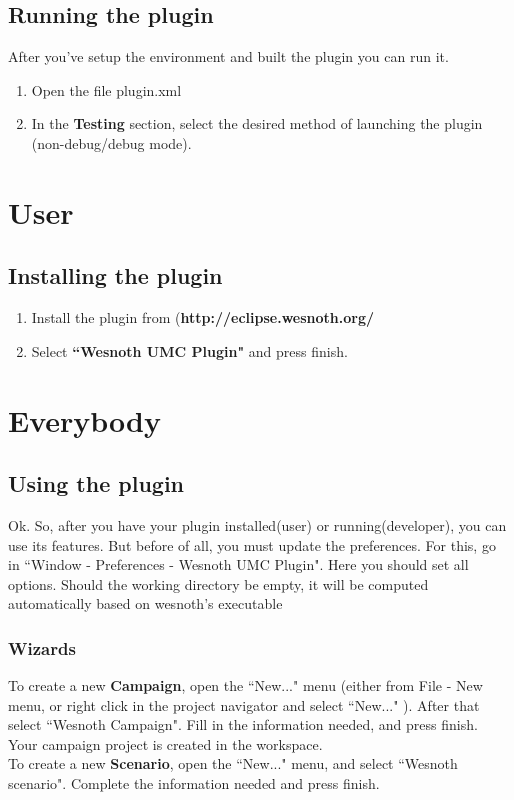 \documentclass[10pt]{article}
\begin{document}
\subsection{Running the plugin}
After you've setup the environment and built the plugin you can run it.
\begin{enumerate}
\item Open the file plugin.xml
\item In the \textbf{Testing} section, select the desired method of launching the plugin
  (non-debug/debug mode).
\end{enumerate}

\section{User}
\subsection{Installing the plugin}
\begin{enumerate}
\item Install the plugin from (\textbf{http://eclipse.wesnoth.org/}
\item Select \textbf{``Wesnoth UMC Plugin"} and press finish.
\end{enumerate}


\section{Everybody}
\subsection{Using the plugin}
Ok. So, after you have your plugin installed(user) or running(developer), you can use its features.
But before of all, you must update the preferences. For this, go in ``Window - Preferences - Wesnoth UMC Plugin".
Here you should set all options. Should the working directory be empty, it will be computed automatically
based on wesnoth's executable

\subsubsection{Wizards}
To create a new \textbf{Campaign}, open the ``New..." menu (either from File - New menu, or right click in the
project navigator and select ``New..." ). After that select ``Wesnoth Campaign". Fill in the information needed,
and press finish. Your campaign project is created in the workspace. \\
To create a new \textbf{Scenario}, open the ``New..." menu, and select ``Wesnoth scenario".
Complete the information needed and press finish.
\end{document}
